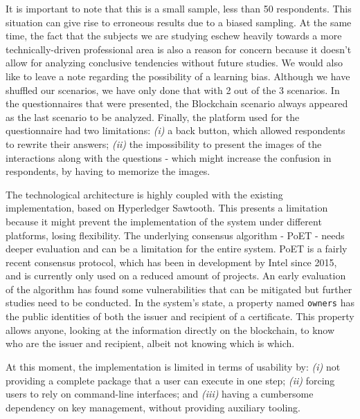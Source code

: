 It is important to note that this is a small sample, less than 50 respondents. This situation can give rise to erroneous results due to a biased sampling. At the same time, the fact that the subjects we are studying eschew heavily towards a more technically-driven professional area is also a reason for concern because it doesn't allow for analyzing conclusive tendencies without future studies. We would also like to leave a note regarding the possibility of a learning bias. Although we have shuffled our scenarios, we have only done that with 2 out of the 3 scenarios. In the questionnaires that were presented, the Blockchain scenario always appeared as the last scenario to be analyzed. Finally, the platform used for the questionnaire had two limitations: \textit{(i)} a back button, which allowed respondents to rewrite their answers; \textit{(ii)} the impossibility to present the images of the interactions along with the questions - which might increase the confusion in respondents, by having to memorize the images.

The technological architecture is highly coupled with the existing implementation, based on Hyperledger Sawtooth. This presents a limitation because it might prevent the implementation of the system under different platforms, losing flexibility. The underlying consensus algorithm - PoET - needs deeper evaluation and can be a limitation for the entire system. PoET is a fairly recent consensus protocol, which has been in development by Intel since 2015, and is currently only used on a reduced amount of projects. An early evaluation of the algorithm has found some vulnerabilities that can be mitigated \cite{chen_security_2017} but further studies need to be conducted. In the system's state, a property named \texttt{owners} has the public identities of both the issuer and recipient of a certificate. This property allows anyone, looking at the information directly on the blockchain, to know who are the issuer and recipient, albeit not knowing which is which.

At this moment, the implementation is limited in terms of usability by: \emph{(i)} not providing a complete package that a user can execute in one step; \emph{(ii)} forcing users to rely on command-line interfaces; and \emph{(iii)} having a cumbersome dependency on key management, without providing auxiliary tooling.